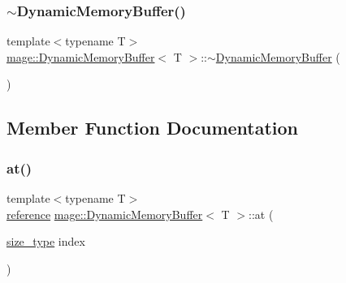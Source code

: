 \mbox{\label{classmage_1_1_dynamic_memory_buffer_a3bc8fafc04980ba739bffd0f28214830}} 
\subsubsection{\texorpdfstring{$\sim$\+Dynamic\+Memory\+Buffer()}{~DynamicMemoryBuffer()}}
{\footnotesize\ttfamily template$<$typename T$>$ \\
\mbox{\hyperlink{classmage_1_1_dynamic_memory_buffer}{mage\+::\+Dynamic\+Memory\+Buffer}}$<$ T $>$\+::$\sim$\mbox{\hyperlink{classmage_1_1_dynamic_memory_buffer}{Dynamic\+Memory\+Buffer}} (\begin{DoxyParamCaption}{ }\end{DoxyParamCaption})\hspace{0.3cm}{\ttfamily [default]}}



\subsection{Member Function Documentation}
\mbox{\label{classmage_1_1_dynamic_memory_buffer_a1dcdbcbefe95ffa5c6472940411d5681}} 
\subsubsection{\texorpdfstring{at()}{at()}\hspace{0.1cm}{\footnotesize\ttfamily [1/2]}}
{\footnotesize\ttfamily template$<$typename T$>$ \\
\mbox{\hyperlink{classmage_1_1_dynamic_memory_buffer_a146681be5119c0329409436506334f05}{reference}} \mbox{\hyperlink{classmage_1_1_dynamic_memory_buffer}{mage\+::\+Dynamic\+Memory\+Buffer}}$<$ T $>$\+::at (\begin{DoxyParamCaption}\item[{\mbox{\hyperlink{classmage_1_1_dynamic_memory_buffer_a45d02825da2b18fd7c24965ed5f46a30}{size\+\_\+type}}}]{index }\end{DoxyParamCaption})}

